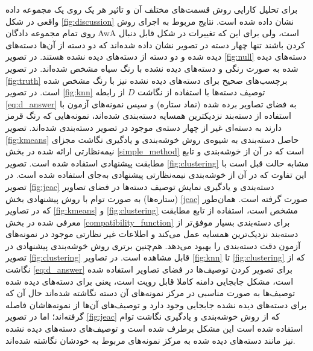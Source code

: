 برای تحلیل کارایی روش قسمت‌های مختلف آن و تاثیر هر یک  روی یک مجموعه داده واقعی در شکل
\ref{fig:discussion}
 نشان داده شده است. نتایج مربوط به اجرای روش روی تمام مجموعه دادگان AwA است، ولی برای این که تغییرات در شکل قابل دنبال کردن باشند تنها چهار دسته در  تصویر نشان داده شده‌اند که دو دسته از آن‌ها دسته‌های دیده شده و دو دسته از دسته‌های دیده نشده هستند. در تصویر
\ref{fig:null}
دسته‌های دیده شده به صورت رنگی و دسته‌های دیده نشده با رنگ سیاه مشخص شده‌اند. در تصویر
\ref{fig:truth}
برچسب‌های صحیح برای دسته‌های دیده نشده نیز با رنگ مشخص شده است. در تصویر
\ref{fig:knn}
توصیف دسته‌ها با استفاده از نگاشت $D$ از رابطه \eqref{eq:d_answer} به فضای تصاویر برده شده (نماد ستاره) و سپس نمونه‌های آزمون با استفاده از دسته‌بند نزدیکترین همسایه دسته‌بندی شده‌اند، نمونه‌هایی که رنگ قرمز دارند به دسته‌ای غیر از چهار دسته‌ی موجود در تصویر دسته‌بندی شده‌اند. تصویر
\ref{fig:kmeans}
حاصل دسته‌بندی به شیوه‌ی روش خوشه‌بندی و یادگیری نگاشت مجزای نیمه‌نظارتی ارائه شده در بخش \ref{simple_method} است که در آن از خوشه‌بندی  و تابع مطابقت پیشنهادی استفاده شده است. تصویر
\ref{fig:clustering}
مشابه حالت قبل است با این تفاوت که در آن از خوشه‌بندی نیمه‌نظارتی پیشنهادی به‌جای  استفاده شده است. در تصویر
\ref{fig:jeac}
دسته‌بندی و یادگیری نمایش توصیف دسته‌ها در فضای تصاویر (ستاره‌ها) به صورت توام با روش پیشنهادی بخش \ref{jeac} صورت گرفته است.
همان‌طور که در تصاویر
\ref{fig:kmeans} و \ref{fig:clustering}
مشخص است، استفاده از  تابع مطابقت معرفی شده در بخش \ref{compatibility_function} برای دسته‌بندی بسیار موفق‌تر از دسته‌بند نزدیک‌ترین همسایه عمل می‌کند و اطلاعات غیر نظارتی موجود در نمونه‌های آزمون دقت  دسته‌بندی را بهبود می‌دهد. هم‌چنین برتری روش خوشه‌بندی پیشنهادی در تصویر \ref{fig:clustering} قابل مشاهده است. در تصاویر \ref{fig:knn} تا \ref{fig:clustering} که از نگاشت  \eqref{eq:d_answer} برای تصویر کردن توصیف‌ها در فضای تصاویر استفاده شده است، مشکل جابجایی دامنه کاملا قابل رویت است، یعنی برای دسته‌های دیده شده توصیف‌ها به صورت مناسبی در مرکز نمونه‌های آن دسته نگاشته شده‌اند حال آن که برای دسته‌های دیده نشده جابجایی وجود دارد و توصیف‌های آن‌ها از نمونه‌هاشان فاصله گرفته‌اند؛ اما در تصویر
\ref{fig:jeac}
که از روش خوشه‌بندی و یادگیری نگاشت توام استفاده شده است این مشکل برطرف شده است و توصیف‌های دسته‌های دیده نشده نیز مانند دسته‌های دیده شده به مرکز نمونه‌های مربوط به خودشان نگاشته شده‌اند.


